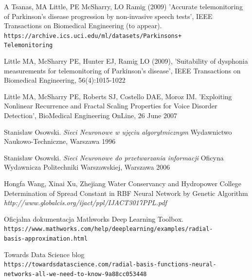 \documentclass{article}
\begin{document}
\newpage
\begin{thebibliography}{9}

A Tsanas, MA Little, PE McSharry, LO Ramig (2009) 
'Accurate telemonitoring of Parkinson’s disease progression by non-invasive speech tests', 
IEEE Transactions on Biomedical Engineering (to appear). 
\\\texttt{https://archive.ics.uci.edu/ml/datasets/Parkinsons+\\Telemonitoring}

Little MA, McSharry PE, Hunter EJ, Ramig LO (2009), 
'Suitability of dysphonia measurements for telemonitoring of Parkinson's disease', 
IEEE Transactions on Biomedical Engineering, 56(4):1015-1022 

Little MA, McSharry PE, Roberts SJ, Costello DAE, Moroz IM. 
'Exploiting Nonlinear Recurrence and Fractal Scaling Properties for Voice Disorder Detection', 
BioMedical Engineering OnLine, 26 June 2007

Stanisław Osowski.
\textit{Sieci Neuronowe w ujęciu algorytmicznym}
Wydawnictwo Naukowo-Techniczne, Warszawa 1996

Stanisław Osowski.
\textit{Sieci Neuronowe do przetwarzania informacji}
Oficyna Wydawnicza Politechniki Warszawskiej, Warszawa 2006

Hongfa Wang, Xinai Xu, Zhejiang
Water Conservancy and Hydropower College
Determination of Spread Constant in RBF Neural Network by Genetic
Algorithm 
\textit{http://www.globalcis.org/ijact/ppl/IJACT3017PPL.pdf}

Oficjalna dokumentacja Mathworks Deep Learning Toolbox. 
\\\texttt{https://www.mathworks.com/help/deeplearning/examples/radial-\\basis-approximation.html}

Towards Data Science blog
\\\texttt{https://towardsdatascience.com/radial-basis-functions-neural-\\networks-all-we-need-to-know-9a88cc053448}


\end{thebibliography}
\newpage

\listoffigures
\newpage
\end{document}
